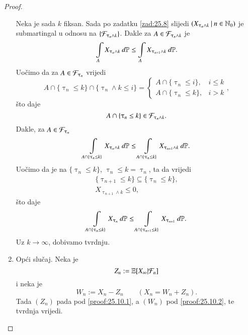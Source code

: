 \begin{proof}
\begin{enumerate}[label=(\alph*)]
        Neka je sada $k$ fiksan.
        Sada po zadatku \ref{zad:25.8} slijedi
        $({X_{\uptau_n \land k}} \: | \: {n \in \mathbb{N}_0})$ je submartingal u odnosu na $\{ \mathcal{F}_{\uptau_n \land k} \}$.
        Dakle za $A \in \mathcal{F}_{\uptau_n \land k}$ je
        \begin{equation*}
            \int\limits_A X_{\uptau_n \land k} \: d \mathbb{P} \leq \int\limits_A X_{\uptau_{n + 1} \land k} \: d \mathbb{P}.
        \end{equation*}
        Uo\v cimo da za $A \in \mathcal{F}_{\uptau_n}$ vrijedi
        \begin{equation*}
            A \cap \{ \uptau_n \leq k \} \cap \{ \uptau_n \land k \leq i \} =
            \begin{cases}
                A \cap \{ \uptau_n \leq i \} ,& i \leq k\\
                A \cap \{ \uptau_n \leq k \} ,& i > k
            \end{cases},
        \end{equation*}
        \v sto daje
        \begin{equation*}
            A \cap \{ \uptau_n \leq k \} \in \mathcal{F}_{\uptau_n \land k}.
        \end{equation*}
        Dakle, za $A \in \mathcal{F}_{\uptau_n}$
        \begin{equation*}
            \int\limits_{A \cap \{ \uptau_n \leq k \}} X_{\uptau_n \land k} \: d \mathbb{P} \leq \int\limits_{A \cap \{ \uptau_n \leq k \}} X_{\uptau_{n + 1} \land k} \: d \mathbb{P}.
        \end{equation*}
        Uo\v cimo da je na $\{ \uptau_n \leq k \}$, $\uptau_n \leq k = \uptau_n$, ta da vrijedi
        \begin{equation*}
            \begin{gathered}
                \{ \uptau_{n + 1} \leq k \} \subseteq \{ \uptau_n \leq k \},\\
                X_{\uptau_{n + 1} \land k} \leq 0,
            \end{gathered}
        \end{equation*}
        \v sto daje
        \begin{equation*}
            \int\limits_{A \cap \{ \uptau_n \leq k \}} X_{\uptau_n} \: d \mathbb{P} \leq \int\limits_{A \cap \{ \uptau_{n + 1} \leq k \}} X_{\uptau_{n + 1}} \: d \mathbb{P}.
        \end{equation*}
        Uz $k \to \infty$, dobivamo tvrdnju.
        \item   \label{proof:25.10.3}
        Op\' ci slu\v caj.
        Neka je
        \begin{equation*}
            Z_n := \mathbb{E} [X_\infty | \mathcal{F}_n]
        \end{equation*}
        i neka je
        \begin{equation*}
            W_n := X_n - Z_n \quad \quad (X_n = W_n + Z_n).
        \end{equation*}
        Tada $(Z_n)$ pada pod \ref{proof:25.10.1}, a $(W_n)$ pod \ref{proof:25.10.2}, te tvrdnja vrijedi.
    \end{enumerate}
\end{proof}

